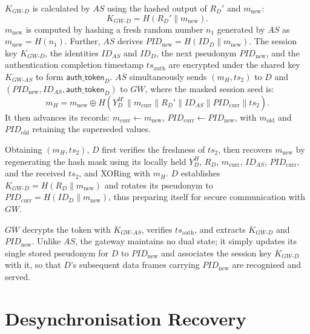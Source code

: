 $K_{GW\text{-}D}$ is calculated by $AS$ using the hashed output of $R_D'$ and
$m_{\mathrm{new}}$:
\begin{equation}
  K_{GW\text{-}D} = H(R_D' \| m_{\mathrm{new}}).
\end{equation}
$m_{\mathrm{new}}$ is computed by hashing a fresh random number $n_1$ generated by
$AS$ as $m_{\mathrm{new}} = H(n_1)$.
Further, $AS$ derives $\mathit{PID}_{\mathrm{new}} = H(ID_D \| m_{\mathrm{new}})$.
The session key $K_{GW\text{-}D}$, the identities $ID_{AS}$ and $ID_D$, the next
pseudonym $\mathit{PID}_{\mathrm{new}}$, and the authentication completion timestamp
$ts_{\mathrm{auth}}$ are encrypted under the shared key $K_{GW\text{-}AS}$ to form
$\mathsf{auth\_token}_D$.
$AS$ simultaneously sends $(m_H, ts_2)$ to $D$ and
$(\mathit{PID}_{\mathrm{new}}, ID_{AS}, \mathsf{auth\_token}_D)$ to $GW$, where
the masked session seed is:
\begin{equation}
  m_H = m_{\mathrm{new}} \oplus H(Y_D^{H'} \| m_{\mathrm{curr}} \| R_D' \|
  ID_{AS} \| \mathit{PID}_{\mathrm{curr}} \| ts_2).
\end{equation}
It then advances its records:
$m_{\mathrm{curr}} \leftarrow m_{\mathrm{new}}$,
$\mathit{PID}_{\mathrm{curr}} \leftarrow \mathit{PID}_{\mathrm{new}}$,
with $m_{\mathrm{old}}$ and $\mathit{PID}_{\mathrm{old}}$ retaining the superseded
values.

Obtaining $(m_H, ts_2)$, $D$ first verifies the freshness of $ts_2$, then recovers
$m_{\mathrm{new}}$ by regenerating the hash mask using its locally held
$Y_D^H$, $R_D$, $m_{\mathrm{curr}}$, $ID_{AS}$, $\mathit{PID}_{\mathrm{curr}}$, and
the received $ts_2$, and XORing with $m_H$.
$D$ establishes $K_{GW\text{-}D} = H(R_D \| m_{\mathrm{new}})$ and rotates its
pseudonym to $\mathit{PID}_{\mathrm{curr}} = H(ID_D \| m_{\mathrm{new}})$, thus
preparing itself for secure communication with $GW$.

$GW$ decrypts the token with $K_{GW\text{-}AS}$, verifies $ts_{\mathrm{auth}}$, and
extracts $K_{GW\text{-}D}$ and $\mathit{PID}_{\mathrm{new}}$.
Unlike $AS$, the gateway maintains no dual state; it simply updates its single
stored pseudonym for $D$ to $\mathit{PID}_{\mathrm{new}}$ and associates the session
key $K_{GW\text{-}D}$ with it, so that $D$'s subsequent data frames carrying
$\mathit{PID}_{\mathrm{new}}$ are recognised and served.

\section{Desynchronisation Recovery}

